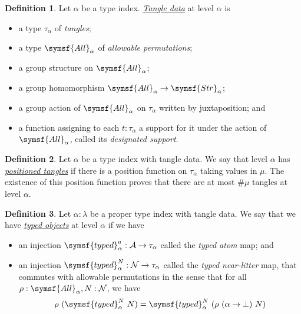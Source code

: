 \documentclass{article}
\newcommand{\cdef}[3]{\href{https://leanprover-community.github.io/con-nf/doc/ConNF/#1.html\#ConNF.#2}{\emph{#3}}}
\theoremstyle{definition}
\newtheorem{definition}{Definition}[section]
\theoremstyle{remark}
\begin{document}
\begin{definition}
    Let \( \alpha \) be a type index.
    \cdef{Fuzz/Hypotheses}{TangleData}{Tangle data} at level \( \alpha \) is
    \begin{itemize}
        \item a type \( \tau_\alpha \) of \emph{tangles};
        \item a type \( \symsf{All}_\alpha \) of \emph{allowable permutations};
        \item a group structure on \( \symsf{All}_\alpha \);
        \item a group homomorphism \( \symsf{All}_\alpha \to \symsf{Str}_\alpha \);
        \item a group action of \( \symsf{All}_\alpha \) on \( \tau_\alpha \) written by juxtaposition; and
        \item a function assigning to each \( t : \tau_\alpha \) a support for it under the action of \( \symsf{All}_\alpha \), called its \emph{designated support}.
    \end{itemize}
\end{definition}
\begin{definition}
    Let \( \alpha \) be a type index with tangle data.
    We say that level \( \alpha \) has \cdef{Fuzz/Hypotheses}{PositionedTangles}{positioned tangles} if there is a position function on \( \tau_\alpha \) taking values in \( \mu \).
    The existence of this position function proves that there are at most \( \#\mu \) tangles at level \( \alpha \).
\end{definition}
\begin{definition}
    Let \( \alpha : \lambda \) be a proper type index with tangle data.
    We say that we have \cdef{Fuzz/Hypotheses}{TypedObjects}{typed objects} at level \( \alpha \) if we have
    \begin{itemize}
        \item an injection \( \symsf{typed}^a_\alpha : \mathcal A \to \tau_\alpha \) called the \emph{typed atom} map; and
        \item an injection \( \symsf{typed}^N_\alpha : \mathcal N \to \tau_\alpha \) called the \emph{typed near-litter} map, that commutes with allowable permutations in the sense that for all \( \rho : \symsf{All}_\alpha, N : \mathcal N \), we have
        \[ \rho\ (\symsf{typed}^N_\alpha\ N) = \symsf{typed}^N_\alpha\ (\rho\ (\alpha \to \bot)\ N) \]
    \end{itemize}
\end{definition}
\end{document}
